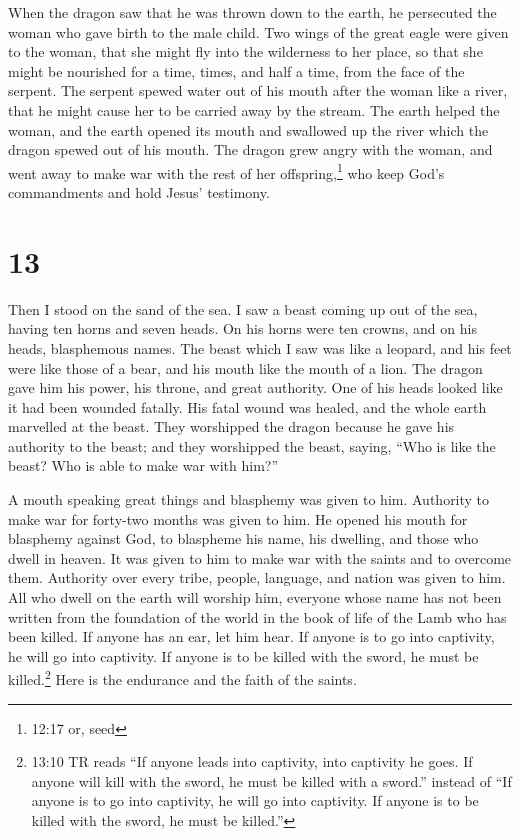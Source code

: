 When the dragon saw that he was thrown down to the earth,
he persecuted the woman who gave birth to the male child. 
Two wings of the great eagle were given to the woman, that she might fly
into the wilderness to her place, so that she might be nourished for a
time, times, and half a time, from the face of the serpent.
 The serpent spewed water out of his mouth after the woman
like a river, that he might cause her to be carried away by the stream.
 The earth helped the woman, and the earth opened its mouth
and swallowed up the river which the dragon spewed out of his mouth.
 The dragon grew angry with the woman, and went away to
make war with the rest of her offspring,\footnote{12:17 or, seed} who
keep God's commandments and hold Jesus' testimony.

\hypertarget{section-12}{%
\section{13}\label{section-12}}

 Then I stood on the sand of the sea. I saw a beast coming
up out of the sea, having ten horns and seven heads. On his horns were
ten crowns, and on his heads, blasphemous names.  The beast
which I saw was like a leopard, and his feet were like those of a bear,
and his mouth like the mouth of a lion. The dragon gave him his power,
his throne, and great authority.  One of his heads looked
like it had been wounded fatally. His fatal wound was healed, and the
whole earth marvelled at the beast.  They worshipped the
dragon because he gave his authority to the beast; and they worshipped
the beast, saying, ``Who is like the beast? Who is able to make war with
him?''

 A mouth speaking great things and blasphemy was given to
him. Authority to make war for forty-two months was given to him.
 He opened his mouth for blasphemy against God, to blaspheme
his name, his dwelling, and those who dwell in heaven.  It
was given to him to make war with the saints and to overcome them.
Authority over every tribe, people, language, and nation was given to
him.  All who dwell on the earth will worship him, everyone
whose name has not been written from the foundation of the world in the
book of life of the Lamb who has been killed.  If anyone has
an ear, let him hear.  If anyone is to go into captivity,
he will go into captivity. If anyone is to be killed with the sword, he
must be killed.\footnote{13:10 TR reads ``If anyone leads into
  captivity, into captivity he goes. If anyone will kill with the sword,
  he must be killed with a sword.'' instead of ``If anyone is to go into
  captivity, he will go into captivity. If anyone is to be killed with
  the sword, he must be killed.''} Here is the endurance and the faith
of the saints.


